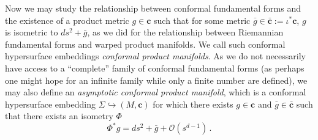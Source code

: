 \documentclass[a4paper,10.9pt]{amsart}
\theoremstyle{definition}
\theoremstyle{remark}
\numberwithin{equation}{section}
\newcommand{\cc}{\boldsymbol{c}}
\renewcommand{\=}{\stackrel \Sigma =}
\begin{document}
Now we may study the relationship between conformal fundamental forms and the existence of a product metric $g \in \cc$ such that for some metric $\bar{g} \in \bar{\cc} := \iota^* \cc$, $g$ is isometric to $ds^2 + \bar{g}$, as we did for the relationship between Riemannian fundamental forms and warped product manifolds. We call such conformal hypersurface embeddings \textit{conformal product manifolds}. As we do not necessarily have access to a ``complete'' family of conformal fundamental forms (as perhaps one might hope for an infinite family while only a finite number are defined), we may also define an \textit{asymptotic conformal product manifold}, which is a conformal hypersurface embedding $\Sigma \hookrightarrow (M,\cc)$ for which there exists  $g \in \cc$ and $\bar{g} \in \bar{\cc}$ such that there exists an isometry $\Phi$
$$\Phi^* g = ds^2 +\bar{g} + \mathcal{O}(s^{d-1})\,.$$

\medskip
\end{document}
